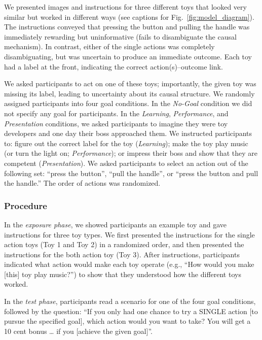 \documentclass[10pt, letterpaper]{article}
\begin{document}
We presented images and instructions for three different toys that
looked very similar but worked in different ways (see captions for
Fig.~\ref{fig:model_diagram}). The instructions conveyed that pressing
the button and pulling the handle was immediately rewarding but
uninformative (fails to disambiguate the causal mechanism). In contrast,
either of the single actions was completely disambiguating, but was
uncertain to produce an immediate outcome. Each toy had a label at the
front, indicating the correct action(s)--outcome link.

We asked participants to act on one of these toys; importantly, the
given toy was missing its label, leading to uncertainty about its causal
structure. We randomly assigned participants into four goal conditions.
In the \emph{No-Goal} condition we did not specify any goal for
participants. In the \emph{Learning}, \emph{Performance}, and
\emph{Presentation} conditions, we asked participants to imagine they
were toy developers and one day their boss approached them. We
instructed participants to: figure out the correct label for the toy
(\emph{Learning}); make the toy play music (or turn the light on;
\emph{Performance}); or impress their boss and show that they are
competent (\emph{Presentation}). We asked participants to select an
action out of the following set: ``press the button'', ``pull the
handle'', or ``press the button and pull the handle.'' The order of
actions was randomized.

\subsubsection{Procedure}\label{procedure}

In the \emph{exposure phase}, we showed participants an example toy and
gave instructions for three toy types. We first presented the
instructions for the single action toys (Toy 1 and Toy 2) in a
randomized order, and then presented the instructions for the both
action toy (Toy 3). After instructions, participants indicated what
action would make each toy operate (e.g., ``How would you make
{[}this{]} toy play music?'') to show that they understood how the
different toys worked.

In the \emph{test phase}, participants read a scenario for one of the
four goal conditions, followed by the question: ``If you only had one
chance to try a SINGLE action {[}to pursue the specified goal{]}, which
action would you want to take? You will get a 10 cent bonus \ldots{} if
you {[}achieve the given goal{]}''.
\end{document}
